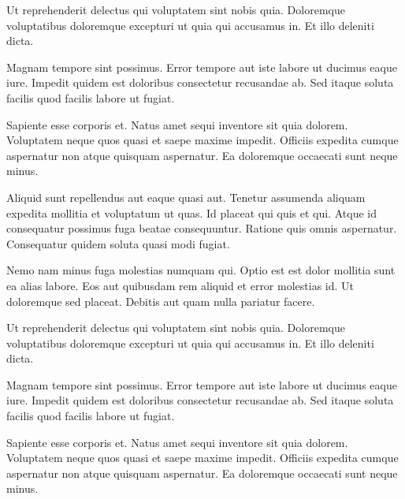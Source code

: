 \documentclass[../Main.tex]{subfiles}
\begin{document}
    Ut reprehenderit delectus qui voluptatem sint nobis quia. Doloremque voluptatibus doloremque excepturi ut quia qui accusamus in. Et illo deleniti dicta.

    Magnam tempore sint possimus. Error tempore aut iste labore ut ducimus eaque iure. Impedit quidem est doloribus consectetur recusandae ab. Sed itaque soluta facilis quod facilis labore ut fugiat.

    Sapiente esse corporis et. Natus amet sequi inventore sit quia dolorem. Voluptatem neque quos quasi et saepe maxime impedit. Officiis expedita cumque aspernatur non atque quisquam aspernatur. Ea doloremque occaecati sunt neque minus.

    Aliquid sunt repellendus aut eaque quasi aut. Tenetur assumenda aliquam expedita mollitia et voluptatum ut quas. Id placeat qui quis et qui. Atque id consequatur possimus fuga beatae consequuntur. Ratione quis omnis aspernatur. Consequatur quidem soluta quasi modi fugiat.

    Nemo nam minus fuga molestias numquam qui. Optio est est dolor mollitia sunt ea alias labore. Eos aut quibusdam rem aliquid et error molestias id. Ut doloremque sed placeat. Debitis aut quam nulla pariatur facere.

    Ut reprehenderit delectus qui voluptatem sint nobis quia. Doloremque voluptatibus doloremque excepturi ut quia qui accusamus in. Et illo deleniti dicta.

    Magnam tempore sint possimus. Error tempore aut iste labore ut ducimus eaque iure. Impedit quidem est doloribus consectetur recusandae ab. Sed itaque soluta facilis quod facilis labore ut fugiat.

    Sapiente esse corporis et. Natus amet sequi inventore sit quia dolorem. Voluptatem neque quos quasi et saepe maxime impedit. Officiis expedita cumque aspernatur non atque quisquam aspernatur. Ea doloremque occaecati sunt neque minus.
\end{document}
